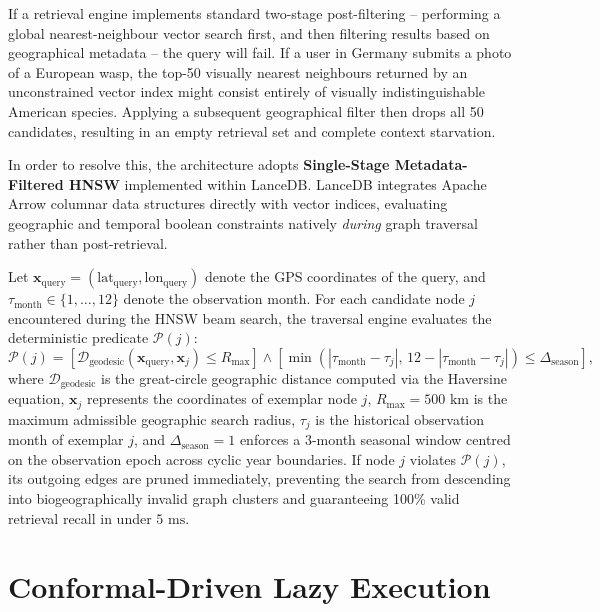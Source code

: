 If a retrieval engine implements standard two-stage post-filtering -- performing a global nearest-neighbour vector search first, and then filtering results based on geographical metadata -- the query will fail. If a user in Germany submits a photo of a European wasp, the top-50 visually nearest neighbours returned by an unconstrained vector index might consist entirely of visually indistinguishable American species. Applying a subsequent geographical filter then drops all 50 candidates, resulting in an empty retrieval set and complete context starvation.

In order to resolve this, the architecture adopts \textbf{Single-Stage Metadata-Filtered HNSW} implemented within LanceDB. LanceDB integrates Apache Arrow columnar data structures directly with vector indices, evaluating geographic and temporal boolean constraints natively \textit{during} graph traversal rather than post-retrieval.

Let $\mathbf{x}_{\text{query}} = (\text{lat}_{\text{query}}, \text{lon}_{\text{query}})$ denote the GPS coordinates of the query, and $\tau_{\text{month}} \in \{1, \dots, 12\}$ denote the observation month. For each candidate node $j$ encountered during the HNSW beam search, the traversal engine evaluates the deterministic predicate $\mathcal{P}(j)$:
\[
\mathcal{P}(j) = \left[ \mathcal{D}_{\text{geodesic}}(\mathbf{x}_{\text{query}}, \mathbf{x}_{j}) \le R_{\max} \right] \land \left[ \min\left( |\tau_{\text{month}} - \tau_{j}|, \, 12 - |\tau_{\text{month}} - \tau_{j}| \right) \le \Delta_{\text{season}} \right],
\]
where $\mathcal{D}_{\text{geodesic}}$ is the great-circle geographic distance computed via the Haversine equation, $\mathbf{x}_{j}$ represents the coordinates of exemplar node $j$, $R_{\max} = 500\text{ km}$ is the maximum admissible geographic search radius, $\tau_{j}$ is the historical observation month of exemplar $j$, and $\Delta_{\text{season}} = 1$ enforces a 3-month seasonal window centred on the observation epoch across cyclic year boundaries. If node $j$ violates $\mathcal{P}(j)$, its outgoing edges are pruned immediately, preventing the search from descending into biogeographically invalid graph clusters and guaranteeing 100\% valid retrieval recall in under $5\text{ ms}$.

\section{Conformal-Driven Lazy Execution}
\label{sec:lazy_execution}

